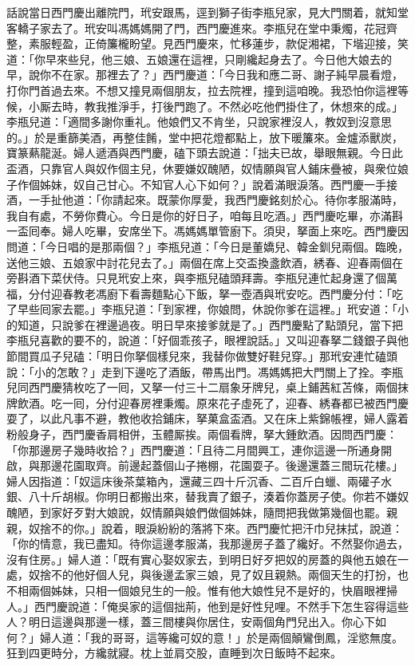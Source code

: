 話說當日西門慶出離院門，玳安跟馬，逕到獅子街李瓶兒家，見大門關着，{}就知堂客轎子家去了。玳安叫馮媽媽開了門，西門慶進來。李瓶兒在堂中秉燭，花冠齊整，素服輕盈，正倚簾櫳盼望。見西門慶來，忙移蓮步，款促湘裙，下堦迎接，笑道：「你早來些兒，他三娘、五娘還在這裡，只剛纔起身去了。今日他大娘去的早，說你不在家。那裡去了？」西門慶道：「今日我和應二哥、謝子純早晨看燈，打你門首過去來。不想又撞見兩個朋友，拉去院裡，撞到這咱晚。我恐怕你這裡等候，小厮去時，教我推淨手，打後門跑了。不然必吃他們掛住了，休想來的成。」李瓶兒道：「適間多謝你重礼。他娘們又不肯坐，只說家裡沒人，教奴到沒意思的。」於是重篩美酒，再整佳餚，堂中把花燈都點上，放下暖簾來。金爐添獸炭，寶篆爇龍涎。婦人遞酒與西門慶，磕下頭去說道：「拙夫已故，舉眼無親。今日此盃酒，只靠官人與奴作個主兒，休要嫌奴醜陋，奴情願與官人鋪床疊被，與衆位娘子作個姊妹，奴自己甘心。{}不知官人心下如何？」說着滿眼淚落。西門慶一手接酒，一手扯他道：「你請起來。既蒙你厚愛，我西門慶銘刻於心。待你孝服滿時，我自有處，不勞你費心。今日是你的好日子，咱每且吃酒。」西門慶吃畢，亦滿斟一盃囘奉。婦人吃畢，安席坐下。馮媽媽單管廚下。須臾，拏面上來吃。西門慶因問道：「今日唱的是那兩個？」李瓶兒道：「今日是董嬌兒、韓金釧兒兩個。臨晚，送他三娘、五娘家中討花兒去了。」兩個在席上交盃換盞飲酒，綉春、迎春兩個在旁斟酒下菜伏侍。只見玳安上來，與李瓶兒磕頭拜壽。李瓶兒連忙起身還了個萬福，分付迎春教老馮廚下看壽麵點心下飯，拏一壺酒與玳安吃。西門慶分付：「吃了早些囘家去罷。」李瓶兒道：「到家裡，你娘問，休說你爹在這裡。」玳安道：「小的知道，只說爹在裡邊過夜。明日早來接爹就是了。」西門慶點了點頭兒，{}當下把李瓶兒喜歡的要不的，說道：「好個乖孩子，眼裡說話。」又叫迎春拏二錢銀子與他節間買瓜子兒磕：「明日你拏個樣兒來，我替你做雙好鞋兒穿。」那玳安連忙磕頭說：「小的怎敢？」走到下邊吃了酒飯，帶馬出門。馮媽媽把大門關上了拴。李瓶兒同西門慶猜枚吃了一囘，又拏一付三十二扇象牙牌兒，桌上鋪茜紅苫條，兩個抹牌飲酒。吃一囘，分付迎春房裡秉燭。原來花子虛死了，迎春、綉春都已被西門慶耍了，以此凡事不避，教他收拾鋪床，拏菓盒盃酒。又在床上紫錦帳裡，婦人露着粉般身子，西門慶香肩相併，玉體厮挨。兩個看牌，拏大鍾飲酒。因問西門慶：「你那邊房子幾時收拾？」西門慶道：「且待二月間興工，連你這邊一所通身開啟，與那邊花園取齊。前邊起蓋個山子捲棚，花園耍子。後邊還蓋三間玩花樓。」婦人因指道：「奴這床後茶葉箱內，還藏三四十斤沉香、二百斤白蠟、兩礶子水銀、八十斤胡椒。你明日都搬出來，替我賣了銀子，湊着你蓋房子使。你若不嫌奴醜陋，到家好歹對大娘說，奴情願與娘們做個姊妹，隨問把我做第幾個也罷。親親，奴捨不的你。」{}說着，眼淚紛紛的落將下來。西門慶忙把汗巾兒抹拭，{}說道：「你的情意，我已盡知。待你這邊孝服滿，我那邊房子蓋了纔好。不然娶你過去，沒有住房。」婦人道：「既有實心娶奴家去，到明日好歹把奴的房蓋的與他五娘在一處，奴捨不的他好個人兒，{}與後邊孟家三娘，見了奴且親熱。兩個天生的打扮，也不相兩個姊妹，只相一個娘兒生的一般。{}惟有他大娘性兒不是好的，快眉眼裡掃人。」西門慶說道：「俺吳家的這個拙荊，他到是好性兒哩。{}不然手下怎生容得這些人？明日這邊與那邊一樣，蓋三間樓與你居住，安兩個角門兒出入。你心下如何？」婦人道：「我的哥哥，這等纔可奴的意！」於是兩個顛鸞倒鳳，淫慾無度。狂到四更時分，方纔就寢。枕上並肩交股，直睡到次日飯時不起來。

